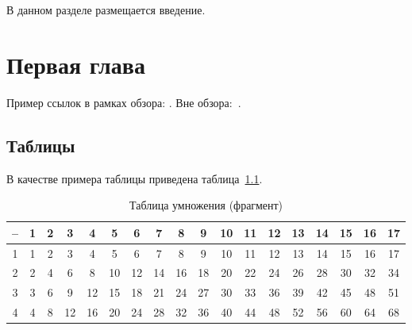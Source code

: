 \documentclass[specification,annotation,times]{itmo-student-thesis}
\begin{document}

\researchpublications{
\begin{refsection}
\nocite{mukhutdinov2019multi}
\printannobibliography
\end{refsection}
}


\tableofcontents

\startprefacepage

В данном разделе размещается введение.

\chapter{Первая глава}

\startrelatedwork
Пример ссылок в рамках обзора: \cite{vyatkin-controllers, q-routing-orig, tan1993multi}.
\finishrelatedwork
Вне обзора:~\cite{bellman}.

\section{Таблицы}

В качестве примера таблицы приведена таблица~\ref{tab1}.

\begin{table}[!h]
\caption{Таблица умножения (фрагмент)}\label{tab1}
\centering
\begin{tabular}{|*{18}{c|}}\hline
-- & 1 & 2 & 3 & 4 & 5 & 6 & 7 & 8 & 9 & 10 & 11 & 12 & 13 & 14 & 15 & 16 & 17 \\\hline
1  & 1 & 2 & 3 & 4 & 5 & 6 & 7 & 8 & 9 & 10 & 11 & 12 & 13 & 14 & 15 & 16 & 17 \\\hline
2  & 2 & 4 & 6 & 8 & 10 & 12 & 14 & 16 & 18 & 20 & 22 & 24 & 26 & 28 & 30 & 32 & 34 \\\hline
3  & 3 & 6 & 9 & 12 & 15 & 18 & 21 & 24 & 27 & 30 & 33 & 36 & 39 & 42 & 45 & 48 & 51 \\\hline
4  & 4 & 8 & 12 & 16 & 20 & 24 & 28 & 32 & 36 & 40 & 44 & 48 & 52 & 56 & 60 & 64 & 68 \\\hline
\end{tabular}
\end{table}
\end{document}
